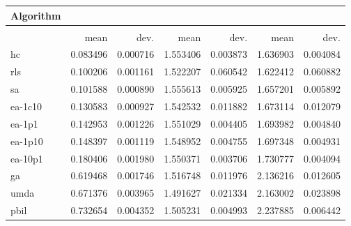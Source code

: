\begin{tabular}{@{} l *{6}{>{{}}N{1}{2}} @{}}
\toprule
{Algorithm} &  \\
\midrule
&  &  &  \\
\midrule
& {mean} & {dev.} & {mean} & {dev.} & {mean} & {dev.} \\
\midrule
hc & 0.083496 & 0.000716 & 1.553406 & 0.003873 & 1.636903 & 0.004084 \\
rls & 0.100206 & 0.001161 & 1.522207 & 0.060542 & 1.622412 & 0.060882 \\
sa & 0.101588 & 0.000890 & 1.555613 & 0.005925 & 1.657201 & 0.005892 \\
ea-1c10 & 0.130583 & 0.000927 & 1.542532 & 0.011882 & 1.673114 & 0.012079 \\
ea-1p1 & 0.142953 & 0.001226 & 1.551029 & 0.004405 & 1.693982 & 0.004840 \\
ea-1p10 & 0.148397 & 0.001119 & 1.548952 & 0.004755 & 1.697348 & 0.004931 \\
ea-10p1 & 0.180406 & 0.001980 & 1.550371 & 0.003706 & 1.730777 & 0.004094 \\
ga & 0.619468 & 0.001746 & 1.516748 & 0.011976 & 2.136216 & 0.012605 \\
umda & 0.671376 & 0.003965 & 1.491627 & 0.021334 & 2.163002 & 0.023898 \\
pbil & 0.732654 & 0.004352 & 1.505231 & 0.004993 & 2.237885 & 0.006442 \\
\bottomrule
\end{tabular}
